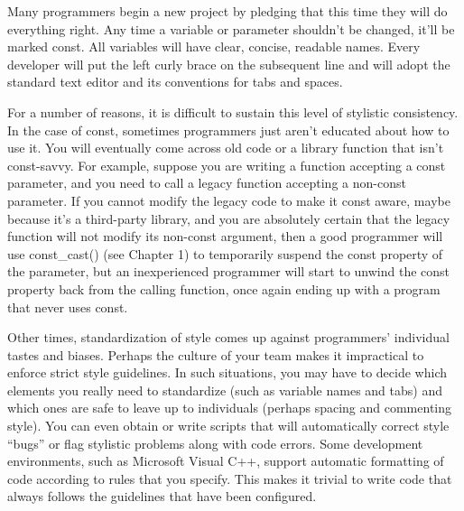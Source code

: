 Many programmers begin a new project by pledging that this time they will do everything right. Any time a variable or parameter shouldn’t be changed, it’ll be marked const. All variables will have clear, concise, readable names. Every developer will put the left curly brace on the subsequent line and will adopt the standard text editor and its conventions for tabs and spaces.

For a number of reasons, it is difficult to sustain this level of stylistic consistency. In the case of const, sometimes programmers just aren’t educated about how to use it. You will eventually come across old code or a library function that isn’t const-savvy. For example, suppose you are writing a function accepting a const parameter, and you need to call a legacy function accepting a non-const parameter. If you cannot modify the legacy code to make it const aware, maybe because it’s a third-party library, and you are absolutely certain that the legacy function will not modify its non-const argument, then a good programmer will use const\_cast() (see Chapter 1) to temporarily suspend the const property of the parameter, but an inexperienced programmer will start to unwind the const property back from the calling function, once again ending up with a program that never uses const.

Other times, standardization of style comes up against programmers’ individual tastes and biases. Perhaps the culture of your team makes it impractical to enforce strict style guidelines. In such situations, you may have to decide which elements you really need to standardize (such as variable names and tabs) and which ones are safe to leave up to individuals (perhaps spacing and commenting style). You can even obtain or write scripts that will automatically correct style “bugs” or flag stylistic problems along with code errors. Some development environments, such as Microsoft Visual C++, support automatic formatting of code according to rules that you specify. This makes it trivial to write code that always follows the guidelines that have been configured.